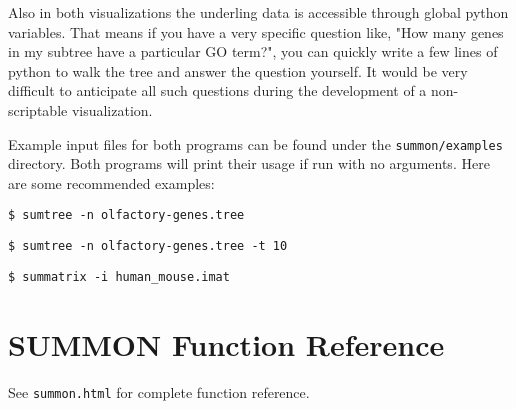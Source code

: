 \documentclass[12pt]{article}
\newcommand{\code}[1]{{\tt #1}}
\newcommand{\codeblock}[1]{\vspace{.1in} {\tt #1} \vspace{.1in}}
\begin{document}
Also in both visualizations the underling data is accessible through global
python variables.  That means if you have a very specific question like, "How
many genes in my subtree have a particular GO term?", you can quickly write a
few lines of python to walk the tree and answer the question yourself.  It would
be very difficult to anticipate all such questions during the development of a
non-scriptable visualization.

Example input files for both programs can be found under the 
\code{summon/examples} directory.  Both programs will print their usage if run
with no arguments.  Here are some recommended examples:

\codeblock{\$ sumtree -n olfactory-genes.tree}

\codeblock{\$ sumtree -n olfactory-genes.tree -t 10}

\codeblock{\$ summatrix -i human\_mouse.imat}


\section{SUMMON Function Reference}

See \code{summon.html} for complete function reference.
\end{document}
